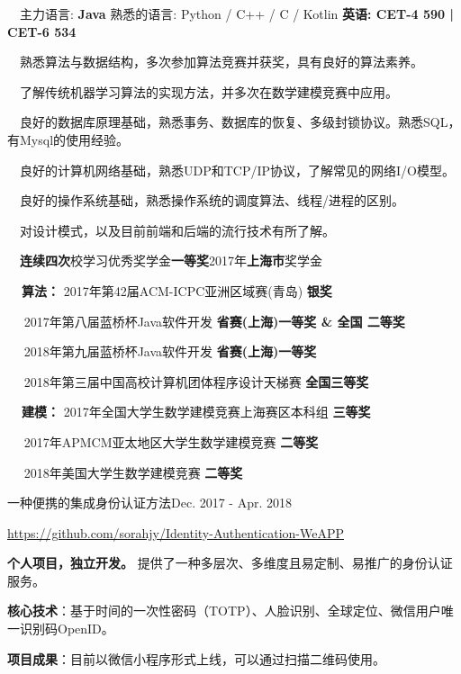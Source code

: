 \documentclass{sorahjy_cv}
\begin{document}
\begin{description}{}
	\item{\ \ 主力语言: } \textbf{Java} \quad 熟悉的语言: Python / C++ / C / Kotlin \quad \textbf{英语: CET-4 590 | CET-6 534}
	\item{\ \ }熟悉算法与数据结构，多次参加算法竞赛并获奖，具有良好的算法素养。
	\item{\ \ }了解传统机器学习算法的实现方法，并多次在数学建模竞赛中应用。
	\item{\ \ }良好的数据库原理基础，熟悉事务、数据库的恢复、多级封锁协议。熟悉SQL，有Mysql的使用经验。
	\item{\ \ }良好的计算机网络基础，熟悉UDP和TCP/IP协议，了解常见的网络I/O模型。
	\item{\ \ }良好的操作系统基础，熟悉操作系统的调度算法、线程/进程的区别。
	\item{\ \ }对设计模式，以及目前前端和后端的流行技术有所了解。
\end{description}

%
%

\begin{description}{}
	\item{\ \ }\textbf{连续四次}校学习优秀奖学金\textbf{一等奖}\quad \quad 2017年\textbf{上海市}奖学金
	\item{\textbf{\ \ 算法：}} 2017年第42届ACM-ICPC亚洲区域赛(青岛) \hfill \textbf{银奖}
	\item{\ \ \quad \quad \quad } 2017年第八届蓝桥杯Java软件开发 \hfill \textbf{省赛(上海)一等奖 \& 全国 二等奖}
	\item{\ \ \quad \quad \quad } 2018年第九届蓝桥杯Java软件开发 \hfill \textbf{省赛(上海)一等奖}
	\item{\ \ \quad \quad \quad } 2018年第三届中国高校计算机团体程序设计天梯赛 \hfill \textbf{全国三等奖}
	\item{\textbf{\ \ 建模：}} 2017年全国大学生数学建模竞赛上海赛区本科组 \hfill \textbf{三等奖}
	\item{\ \ \quad \quad \quad } 2017年APMCM亚太地区大学生数学建模竞赛 \hfill \textbf{二等奖}
	\item{\ \ \quad \quad \quad } 2018年美国大学生数学建模竞赛 \hfill \textbf{二等奖}
\end{description}


%
%


\begin{sectionContentSimple}{一种便携的集成身份认证方法}{Dec. 2017 - Apr. 2018}
	\item \url{https://github.com/sorahjy/Identity-Authentication-WeAPP}
	\item \textbf{个人项目，独立开发。} 提供了一种多层次、多维度且易定制、易推广的身份认证服务。
	\item \textbf{核心技术}：基于时间的一次性密码（TOTP）、人脸识别、全球定位、微信用户唯一识别码OpenID。
	\item \textbf{项目成果}：目前以微信小程序形式上线，可以通过扫描二维码使用。
\end{sectionContentSimple}
\end{document}
